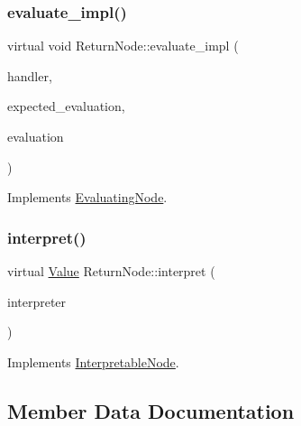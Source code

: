 \subsubsection{\texorpdfstring{evaluate\+\_\+impl()}{evaluate\_impl()}}
{\footnotesize\ttfamily virtual void Return\+Node\+::evaluate\+\_\+impl (\begin{DoxyParamCaption}\item[{\hyperlink{classSystemHandler}{System\+Handler} $\ast$}]{handler,  }\item[{\hyperlink{statics_8h_a6664c451ca7787483a7981cc1de68dbb}{E\+V\+A\+L\+U\+A\+T\+I\+O\+N\+\_\+\+T\+Y\+PE}}]{expected\+\_\+evaluation,  }\item[{struct \hyperlink{structEvaluation}{Evaluation} $\ast$}]{evaluation }\end{DoxyParamCaption})\hspace{0.3cm}{\ttfamily [virtual]}}



Implements \hyperlink{classEvaluatingNode_a085fa06e0b46a93c814dc55cda0c1b26}{Evaluating\+Node}.

\mbox{\label{classReturnNode_ae6c35829787a4f880b3ee1fa4b2e98d3}} 
\subsubsection{\texorpdfstring{interpret()}{interpret()}}
{\footnotesize\ttfamily virtual \hyperlink{classValue}{Value} Return\+Node\+::interpret (\begin{DoxyParamCaption}\item[{\hyperlink{classInterpreter}{Interpreter} $\ast$}]{interpreter }\end{DoxyParamCaption})\hspace{0.3cm}{\ttfamily [virtual]}}



Implements \hyperlink{classInterpretableNode_a9a466e7d65c4b323d2b96b4ac8396cd7}{Interpretable\+Node}.



\subsection{Member Data Documentation}
\mbox{\label{classReturnNode_a27f21d586d90935184261ea34cf2a253}} 
